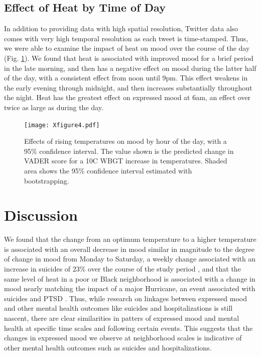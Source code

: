 \documentclass[titlepage]{article}
\begin{document}
\subsection*{Effect of Heat by Time of Day}
In addition to providing data with high spatial resolution, Twitter data also comes with very high temporal resolution as each tweet is time-stamped. Thus, we were able to examine the impact of heat on mood over the course of the day (Fig. \ref{fig:ts-wbgt}). We found that heat is associated with improved mood for a brief period in the late morning, and then has a negative effect on mood during the latter half of the day, with a consistent effect from noon until 9pm. This effect weakens in the early evening through midnight, and then increases substantially throughout the night. Heat has the greatest effect on expressed mood at 6am, an effect over twice as large as during the day.

\begin{figure}[H]
 \centering
 \texttt{[image: Xfigure4.pdf]}
 \caption{Effects of rising temperatures on mood by hour of the day, with a 95\% confidence interval. The value shown is the predicted change in VADER score for a 10\textdegree C WBGT increase in temperatures. Shaded area shows the 95\% confidence interval estimated with bootstrapping.}
 \label{fig:ts-wbgt}
\end{figure}

\section*{Discussion}
We found that the change from an optimum temperature to a higher temperature is associated with an overall decrease in mood similar in magnitude to the degree of change in mood from Monday to Saturday, a weekly change associated with an increase in suicides of 23\% over the course of the study period \citep{CDC2021}, and that the same level of heat in a poor or Black neighborhood is associated with a change in mood nearly matching the impact of a major Hurricane, an event associated with suicides and PTSD \citep{Schwartz2017Aug, Lieberman-Cribbin2017}.  Thus, while research on linkages between expressed mood and other mental health outcomes like suicides and hospitalizations is still nascent, there are clear similarities in patters of expressed mood and mental health at specific time scales and following certain events.  This suggests that the changes in expressed mood we observe at neighborhood scales is indicative of other mental health outcomes such as suicides and hospitalizations.
\end{document}
